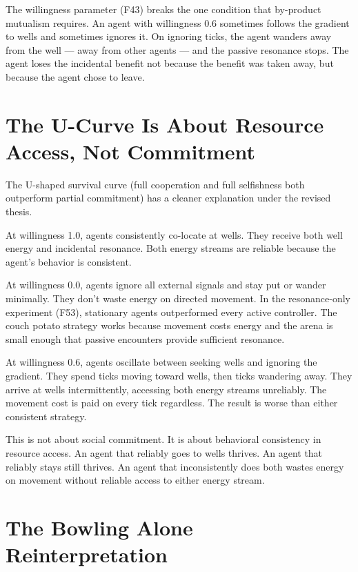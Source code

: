 The willingness parameter (F43) breaks the one condition that by-product mutualism requires. An agent with willingness 0.6 sometimes follows the gradient to wells and sometimes ignores it. On ignoring ticks, the agent wanders away from the well --- away from other agents --- and the passive resonance stops. The agent loses the incidental benefit not because the benefit was taken away, but because the agent chose to leave.

\section{The U-Curve Is About Resource Access, Not Commitment}\label{the-u-curve-is-about-resource-access-not-commitment}

The U-shaped survival curve (full cooperation and full selfishness both outperform partial commitment) has a cleaner explanation under the revised thesis.

At willingness 1.0, agents consistently co-locate at wells. They receive both well energy and incidental resonance. Both energy streams are reliable because the agent's behavior is consistent.

At willingness 0.0, agents ignore all external signals and stay put or wander minimally. They don't waste energy on directed movement. In the resonance-only experiment (F53), stationary agents outperformed every active controller. The couch potato strategy works because movement costs energy and the arena is small enough that passive encounters provide sufficient resonance.

At willingness 0.6, agents oscillate between seeking wells and ignoring the gradient. They spend ticks moving toward wells, then ticks wandering away. They arrive at wells intermittently, accessing both energy streams unreliably. The movement cost is paid on every tick regardless. The result is worse than either consistent strategy.

This is not about social commitment. It is about behavioral consistency in resource access. An agent that reliably goes to wells thrives. An agent that reliably stays still thrives. An agent that inconsistently does both wastes energy on movement without reliable access to either energy stream.

\section{The Bowling Alone Reinterpretation}\label{the-bowling-alone-reinterpretation}

